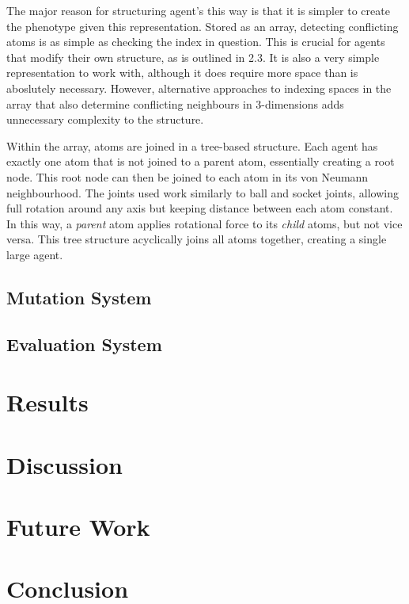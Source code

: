 \documentclass[runningheads]{llncs}
\begin{document}
The major reason for structuring agent's this way is that it is simpler to create the phenotype given this representation.
Stored as an array, detecting conflicting atoms is as simple as checking the index in question.
This is crucial for agents that modify their own structure, as is outlined in 2.3.
It is also a very simple representation to work with, although it does require more space than is aboslutely necessary.
However, alternative approaches to indexing spaces in the array that also determine conflicting neighbours in 3-dimensions adds unnecessary complexity to the structure.

Within the array, atoms are joined in a tree-based structure.
Each agent has exactly one atom that is not joined to a parent atom, essentially creating a root node.
This root node can then be joined to each atom in its von Neumann neighbourhood.
The joints used work similarly to ball and socket joints, allowing full rotation around any axis but keeping distance between each atom constant.
In this way, a \textit{parent} atom applies rotational force to its \textit{child} atoms, but not vice versa.
This tree structure acyclically joins all atoms together, creating a single large agent.

\subsection{Mutation System}

\subsection{Evaluation System}

\section{Results}

\section{Discussion}

\section{Future Work}

\section{Conclusion}
\end{document}
